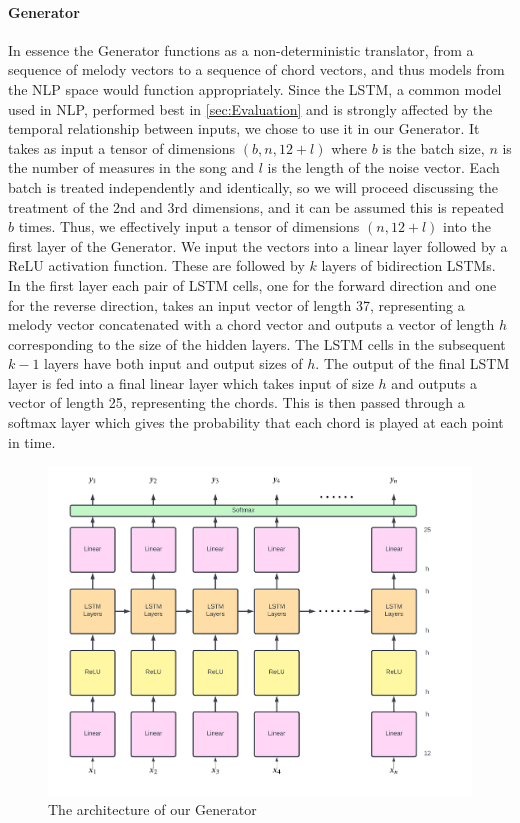 \paragraph{Generator}
In essence the Generator functions as a non-deterministic translator, from a sequence of melody vectors to a sequence of chord vectors, and thus models from the NLP space would function appropriately.
Since the LSTM, a common model used in NLP, performed best in \autoref{sec:Evaluation} and is strongly affected by the temporal relationship between inputs, we chose to use it in our Generator.
It takes as input a tensor of dimensions $(b,n,12+l)$ where $b$ is the batch size, $n$ is the number of measures in the song and $l$ is the length of the noise vector.
Each batch is treated independently and identically, so we will proceed discussing the treatment of the 2nd and 3rd dimensions, and it can be assumed this is repeated $b$ times.
Thus, we effectively input a tensor of dimensions $(n,12+l)$ into the first layer of the Generator.
We input the vectors into a linear layer followed by a ReLU activation function. 
These are followed by $k$ layers of bidirection LSTMs.
In the first layer each pair of LSTM cells, one for the forward direction and one for the reverse direction, takes an input vector of length 37, representing a melody vector concatenated with a chord vector and outputs a vector of length $h$ corresponding to the size of the hidden layers.
The LSTM cells in the subsequent $k-1$ layers have both input and output sizes of $h$.
The output of the final LSTM layer is fed into a final linear layer which takes input of size $h$ and outputs a vector of length 25, representing the chords.
This is then passed through a softmax layer which gives the probability that each chord is played at each point in time.

\begin{figure}
    \centering
    \includegraphics[width=0.8\columnwidth]{Figures/Generator}
    \decoRule
    \caption{The architecture of our Generator}
    \label{fig:Generator}
\end{figure}

